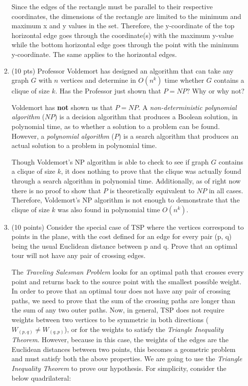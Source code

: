 \documentclass[12pt]{article}
\begin{document}
\begin{enumerate}
{		Since the edges of the rectangle must be parallel to their respective coordinates, the dimensions of the rectangle are limited to the minimum and maximum x and y values in the set. Therefore, the y-coordinate of the top horizontal edge goes through the coordinate(s) with the maximum y-value while the bottom horizontal edge goes through the point with the minimum y-coordinate. The same applies to the horizontal edges.
	}\newpage
    
\item (10 pts) Professor Voldemort has designed an algorithm that can take any graph $G$ with $n$ vertices and determine in $O(n^k)$ time whether $G$ contains a clique of size $k$. Has the Professor just shown that $P = NP$? Why or why not?

	{\color{blue}
		Voldemort has \textbf{not} shown us that $P = NP$. A \emph{non-deterministic polynomial algorithm} ($NP$) is a decision algorithm that produces a Boolean solution, in polynomial time, as to whether a solution to a problem can be found. However, a \emph{polynomial algorithm} ($P$) is a search algorithm that produces an actual solution to a problem in polynomial time. 

Though Voldemort's NP algorithm is able to check to see if graph $G$ contains a clique of size $k$, it does nothing to prove that the clique was actually found through a search algorithm in polynomial time. Additionally, as of right now there is no proof to show that $P$ is theoretically equivalent to $NP$ in all cases. Therefore, Voldemort's NP algorithm is not enough to demonstrate that the clique of size $k$ was also found in polynomial time $O(n^k)$.
	}\newpage

\item (10 points) Consider the special case of TSP where the vertices correspond to points in the plane, with the cost defined for an edge for every pair (p, q) being the usual Euclidean distance between p and q. Prove that an optimal tour will not have any pair of crossing edges.

	{\color{blue}
		The \emph{Traveling Salesman Problem} looks for an optimal path that crosses every point and returns back to the source point with the smallest possible weight. In order to prove that an optimal tour does not have any pair of crossing paths, we need to prove that the sum of the crossing paths are longer than the sum of any two outer paths. Now, in general, TSP does not require weights between two vertices to be symmetric in both directions ($W_{(p,q)} \neq W_{(q,p)}$), or for the weights to satisfy the \emph{Triangle Inequality Theorem}. However, because in this case, the weights of the edges are the Euclidean distances between two points, this becomes a geometric problem and must satisfy both the above properties. We are going to use the \emph{Triangle Inequality Theorem} to prove our hypothesis. For simplicity, consider the below quadrilateral:

}
\end{enumerate}
\end{document}
